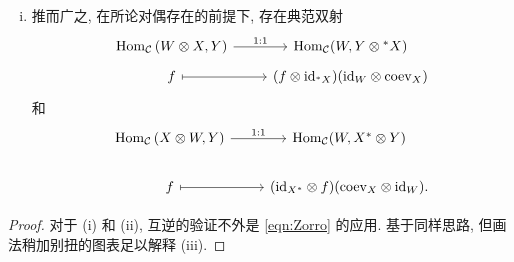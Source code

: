 \begin{proposition}
\begin{enumerate}[(i)]
\begin{equation*}
\begin{aligned}
\begin{tikzpicture}[baseline=(M)]
				\path (A) edge[->] node[midway, draw, fill=white] {$f$} (B);
				\coordinate (M) at ($(A)!.5!(B)$);
			\end{tikzpicture}
			& \; \longmapsto \; \begin{tikzpicture}[baseline=(B), bend angle=70]
				\node (A) {$X$};
				\node (B) [left=of A] {$X^*$};
				\node (C) [below=of A] {$Y$};
				\node (D) [below=of B] {$X^*$};
				\path (B) edge[bend left] node[auto] {$\mathrm{coev}_X$} (A);
				\path (A) edge[->] node[midway, draw, fill=white] {$f$} (C);
				\path (B) edge (D);
			\end{tikzpicture}
			\\
			\begin{tikzpicture}[baseline=(D), bend angle=70]
				\node (B) {$X$};
				\node (C) [right=of B] {$X^*$};
				\node (D) [right=of C] {$Y$};
				\node (A) [below=of D] {$Y$};
				\path (D) edge[->] (A);
				\path (B) edge[bend right] node[auto] {$\mathrm{ev}_X$} (C);
				\path (C) edge[bend left] node[midway, draw, fill=white] {$\varphi$} (D);
			\end{tikzpicture}
			& \; \longmapsfrom \;
			\begin{tikzpicture}[baseline=(A), bend angle=70]
				\node (A) {$X^*$};
				\node (B) [right=of A] {$Y$};
				\path (A) edge[bend left] node[midway, draw, fill=white] {$\varphi$} (B);
			\end{tikzpicture}
		\end{aligned}\end{equation*}
		\item 推而广之, 在所论对偶存在的前提下, 存在典范双射
		\[\begin{tikzcd}[row sep=tiny]
			\Hom_{\mathcal{C}}\left( W \otimes X, Y \right) \arrow[r, "1:1"] & \Hom_{\mathcal{C}}(W, Y \otimes {}^* X) \\
			f \arrow[mapsto, r] & (f \otimes \identity_{{}^* X}) (\identity_W \otimes \mathrm{coev}_X)
		\end{tikzcd}\]
		和
		\[\begin{tikzcd}
			\Hom_{\mathcal{C}}\left( X \otimes W, Y \right) \arrow[r, "1:1"] & \Hom_{\mathcal{C}}(W, X^* \otimes Y) \\
			f \arrow[mapsto, r] & (\identity_{X^*} \otimes f) (\mathrm{coev}_X \otimes \identity_W).
		\end{tikzcd}\]
	\end{enumerate}
\end{proposition}
\begin{proof}
	对于 (i) 和 (ii), 互逆的验证不外是 \eqref{eqn:Zorro} 的应用. 基于同样思路, 但画法稍加别扭的图表足以解释 (iii).
\end{proof}

